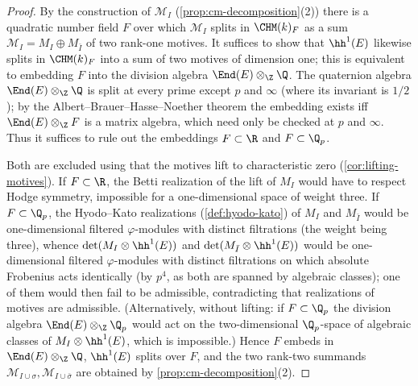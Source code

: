 \begin{proof}
  By the construction of \(\mathcal{M}_I\) (\cref{prop:cm-decomposition}(2)) there
  is a quadratic number field \(F\) over which \(\mathcal{M}_I\) splits in
  \(\CHM(k)_{F}\) as a sum \(\mathcal{M}_I = M_I \oplus M_{\bar I}\) of two
  rank-one motives. It suffices to show that \(\hh^1(E)\) likewise splits in
  \(\CHM(k)_{F}\) into a sum of two motives of dimension one; this is equivalent
  to embedding \(F\) into the division algebra \(\End(E) \otimes_\Z \Q\). The
  quaternion algebra \(\End(E) \otimes_\Z \Q\) is split at every prime except
  \(p\) and \(\infty\) (where its invariant is \(1/2\)); by the
  Albert--Brauer--Hasse--Noether theorem the embedding exists iff
  \(\End(E) \otimes_\Z F\) is a matrix algebra, which need only be checked at
  \(p\) and \(\infty\). Thus it suffices to rule out the embeddings
  \(F \subset \R\) and \(F \subset \Q_p\).

  Both are excluded using that the motives lift to characteristic zero
  (\cref{cor:lifting-motives}). If \(F \subset \R\), the Betti realization of the
  lift of \(M_I\) would have to respect Hodge symmetry, impossible for a
  one-dimensional space of weight three. If \(F \subset \Q_p\), the Hyodo--Kato
  realizations (\cref{def:hyodo-kato}) of \(M_I\) and \(M_{\bar I}\) would be
  one-dimensional filtered \(\varphi\)-modules with distinct filtrations (the
  weight being three), whence \(\det(M_I \otimes \hh^1(E))\) and
  \(\det(M_{\bar I} \otimes \hh^1(E))\) would be one-dimensional filtered
  \(\varphi\)-modules with distinct filtrations on which absolute Frobenius acts
  identically (by \(p^4\), as both are spanned by algebraic classes); one of them
  would then fail to be admissible, contradicting that realizations of motives
  are admissible. (Alternatively, without lifting: if \(F \subset \Q_p\) the
  division algebra \(\End(E) \otimes_\Z \Q_p\) would act on the two-dimensional
  \(\Q_p\)-space of algebraic classes of \(M_I \otimes \hh^1(E)\), which is
  impossible.) Hence \(F\) embeds in \(\End(E) \otimes_\Z \Q\), \(\hh^1(E)\)
  splits over \(F\), and the two rank-two summands
  \(\mathcal{M}_{I \cup \sigma}, \mathcal{M}_{I \cup \bar\sigma}\) are obtained by
  \cref{prop:cm-decomposition}(2).
\end{proof}

